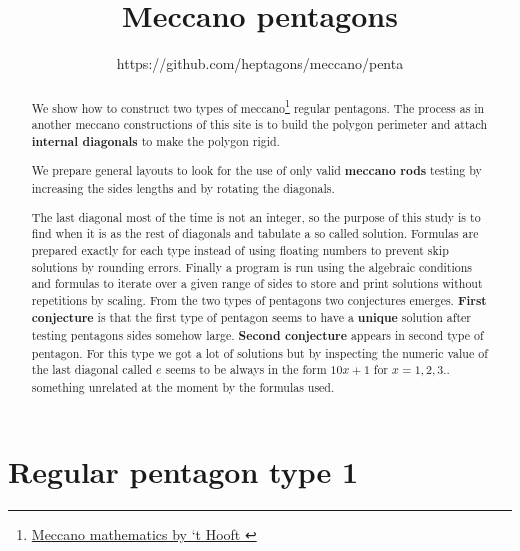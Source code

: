 \documentclass[11pt]{article}
\title{\textbf{Meccano pentagons}}
\author{https://github.com/heptagons/meccano/penta}
\date{}
\begin{document}
\maketitle
\begin{abstract}
We show how to construct two types of meccano\footnote{
\href{https://webspace.science.uu.nl/~hooft101/lectures/meccano.pdf}{Meccano mathematics by `t Hooft }
}
regular pentagons.
The process as in another meccano constructions of this site is to build
the polygon perimeter and attach \textbf{internal diagonals} to make the polygon rigid.

We prepare general layouts to look for the use of only valid \textbf{meccano rods} testing 
by increasing the sides lengths and by rotating the diagonals.

The last diagonal most of the time is not an integer, so the purpose of this study is to find
when it is as the rest of diagonals and tabulate a so called solution. Formulas are
prepared exactly for each type instead of using floating numbers to prevent skip solutions by
rounding errors. Finally a program is run using the algebraic conditions and formulas
to iterate over a given range of sides to store and print solutions without repetitions by scaling.
\newline\newline
From the two types of pentagons two conjectures emerges. \textbf{First conjecture} is
that the first type of pentagon seems to have a \textbf{unique} solution after testing
pentagons sides somehow large.
\newline\newline
\textbf{Second conjecture} appears in second type of pentagon. For this type we got a lot of solutions 
but by inspecting the numeric value of the last diagonal called $e$ seems to be always in the form
\textbf{$10x + 1$} for $x = 1,2,3..$ something unrelated at the moment by the formulas used.
\end{abstract}

\section{Regular pentagon type 1}
\end{document}
